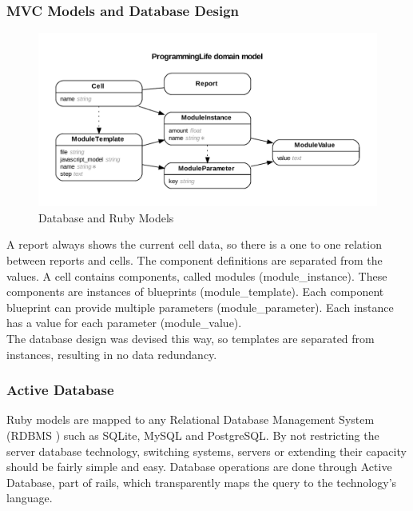 \documentclass{report}
\begin{document}
				\subsubsection{MVC Models and Database Design}
					\begin{figure}[htb]
						\begin{center}
							\includegraphics[width=\linewidth]{erd.pdf}
							\caption{Database and Ruby Models}
							\label{fig: erd}
						\end{center}
					\end{figure}	
					A report always shows the current cell data, so there is a one to one relation between reports and cells. The component definitions are separated from the values. A cell contains components, called modules (module\_instance). These components are instances of blueprints (module\_template). Each component blueprint can provide multiple parameters (module\_parameter). Each instance has a value for each parameter (module\_value).\\
					The database design was devised this way, so templates are separated from instances, resulting in no data redundancy.
					
				\subsubsection{Active Database}
					Ruby models are mapped to any Relational Database Management System (RDBMS \cite{rdbms} ) such as SQLite, MySQL and PostgreSQL. By not restricting the server database technology, switching systems, servers or extending their capacity should be fairly simple and easy. Database operations are done through Active Database, part of rails, which transparently maps the query to the technology's language.
					
\end{document}
